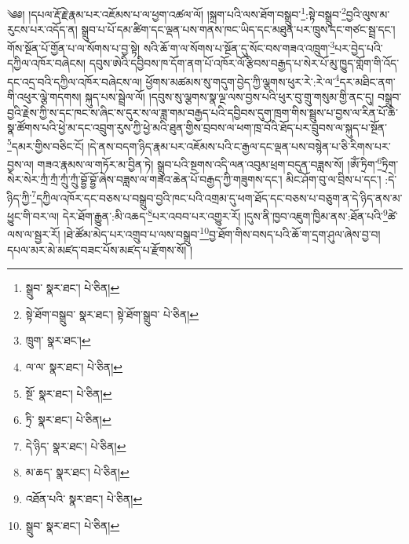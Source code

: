 \setcounter{footnote}{0} 
༄༅། །དཔལ་རྡོ་རྗེ་རྣམ་པར་འཇོམས་པ་ལ་ཕྱག་འཚལ་ལོ། །སྐྲག་པའི་ལས་ཐོག་བསྒྲུབ་\footnote{སྒྲུབ་  སྣར་ཐང་།  པེ་ཅིན། }:སྟེ་བསྒྲུབ་\footnote{སྟེ་ཐོག་བསྒྲུབ་  སྣར་ཐང་། སྟེ་ཐོག་སྒྲུབ་  པེ་ཅིན། }བྱའི་ལུས་མ་རུངས་པར་འདོད་ན། སྒྲུབ་པ་པོ་དམ་ཚིག་དང་ལྡན་པས་གནས་ཁང་ཡིད་དང་མཐུན་པར་ཁྲུས་དང་གཙང་སྦྲ་དང་། གོས་སྔོན་པོ་གྱོན་པ་ལ་སོགས་པ་བྱ་སྟེ། སའི་ཆོ་ག་ལ་སོགས་པ་སྔོན་དུ་སོང་བས་གཟའ་འཁྲུག་\footnote{ཁྲུག་  སྣར་ཐང་། }པར་བྱེད་པའི་དཀྱིལ་འཁོར་བཞེངས། དབུས་ཨེའི་དབྱིབས་ཁ་དོག་ནག་པོ་འཁོར་ལོ་རྩིབས་བརྒྱད་པ་སེར་པོ་མུ་ཁྱུད་གློག་གི་འོད་དང་འདྲ་བའི་དཀྱིལ་འཁོར་བཞེངས་ལ། ཕྱོགས་མཚམས་སུ་གདུག་བྱེད་ཀྱི་ལྕགས་ཕུར་རེ་:རེ་ལ་\footnote{ལ་ལ་  སྣར་ཐང་།  པེ་ཅིན། }དར་མཐིང་ནག་གི་འཕུར་ལྕེ་གདགས། སྐུད་པས་སྦྲེལ་ལོ། །དབུས་སུ་ལྕགས་སྣ་ལྔ་ལས་བྱས་པའི་ཕུར་བུ་གྲུ་གསུམ་གྱི་ནང་དུ། བསྒྲུབ་བྱའི་རྗེས་ཀྱི་ས་དང་ཁང་ས་ཞིང་ས་དུར་ས་ལ་ཟླ་གམ་བརྒྱད་པའི་དབྱིབས་དུག་ཁྲག་གིས་སྦྲུས་པ་བྱས་ལ་རིན་པོ་ཆེ་སྣ་ཚོགས་པའི་ཕྱེ་མ་དང་འབྲུག་རུས་ཀྱི་ཕྱེ་མའི་ཐུན་གྱིས་བྲབས་ལ་ཕག་ཁྲ་བོའི་ཐོད་པར་བྲུབས་ལ་སྐུད་པ་སྔོན་\footnote{སྔོ་  སྣར་ཐང་།  པེ་ཅིན། }དམར་གྱིས་བཅིང་ངོ། །དེ་ནས་བདག་ཉིད་རྣམ་པར་འཇོམས་པའི་ང་རྒྱལ་དང་ལྡན་པས་བསྙེན་པ་ཅི་རིགས་པར་བྱས་ལ། གཟའ་རྣམས་ལ་གཏོར་མ་བྱིན་ཏེ། སྒྲུབ་པའི་སྔགས་འདི་ལན་འབུམ་ཕྲག་བདུན་བཟླས་སོ། །ཨོཾ་ཏྲིག་\footnote{ཏྲི་  སྣར་ཐང་།  པེ་ཅིན། }ཏྲིག་སེར་སེར་ཀྲཾ་ཀྲཾ་ཀྲུཾ་ཀྲུཾ་བྷྱོ་བྷྱོ་ཞེས་བཟླས་ལ་གཟའ་ཆེན་པོ་བརྒྱད་ཀྱི་གཟུགས་དང་། མིང་ཤོག་བུ་ལ་བྲིས་པ་དང་། :དེ་ཉིད་ཀྱི་\footnote{དེ་ཉིད་  སྣར་ཐང་།  པེ་ཅིན། }དཀྱིལ་འཁོར་དང་བཅས་པ་བསྒྲུབ་བྱའི་ཁང་པའི་འགྲམ་དུ་ཕག་ཐོད་དང་བཅས་པ་བཅུག་ན་དེ་ཉིད་ནས་མ་ཕྱུང་གི་བར་ལ། དེར་ཐོག་རྒྱུན་:མི་འཆད་\footnote{མ་ཆད་  སྣར་ཐང་།  པེ་ཅིན། }པར་འབབ་པར་འགྱུར་རོ། །དུས་ནི་ཁྱབ་འཇུག་ཁྱིམ་ནས་:ཐོན་པའི་\footnote{འཐོན་པའི་  སྣར་ཐང་།  པེ་ཅིན། }ཚེ་ལས་ལ་སྦྱར་རོ། །ཐེ་ཚོམ་མེད་པར་འགྲུབ་པ་ལས་བསྒྲུབ་\footnote{སྒྲུབ་  སྣར་ཐང་།  པེ་ཅིན། }བྱ་ཐོག་གིས་བསད་པའི་ཆོ་ག་དྲག་ཤུལ་ཞེས་བྱ་བ། དཔལ་མར་མེ་མཛད་བཟང་པོས་མཛད་པ་རྫོགས་སོ། ། 